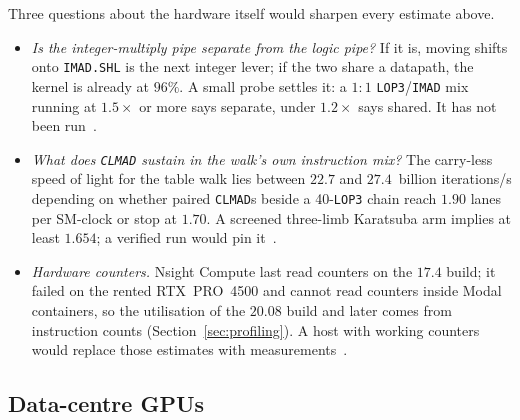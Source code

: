 Three questions about the hardware itself would sharpen every estimate
above.
\begin{itemize}[leftmargin=1.2em,itemsep=0.2em]
\item \emph{Is the integer-multiply pipe separate from the logic pipe?}
  If it is, moving shifts onto \texttt{IMAD.SHL} is the next integer
  lever; if the two share a datapath, the kernel is already at $96\%$.
  A small probe settles it: a $1{:}1$ \texttt{LOP3}/\texttt{IMAD} mix
  running at $1.5\times$ or more says separate, under $1.2\times$ says
  shared. It has not been run~.
\item \emph{What does \texttt{CLMAD} sustain in the walk's own
  instruction mix?} The carry-less speed of light for the table walk
  lies between $22.7$ and $27.4$~billion iterations/s depending on
  whether paired \texttt{CLMAD}s beside a 40-\texttt{LOP3} chain reach
  $1.90$ lanes per SM-clock or stop at $1.70$. A screened three-limb
  Karatsuba arm implies at least $1.654$; a verified run would pin
  it~.
\item \emph{Hardware counters.} Nsight Compute last read counters on
  the $17.4$ build; it failed on the rented RTX~PRO~4500 and cannot read
  counters inside Modal containers, so the utilisation of the $20.08$
  build and later comes from instruction counts
  (Section~\ref{sec:profiling}). A host with working counters would
  replace those estimates with measurements~.
\end{itemize}

\subsection{Data-centre GPUs}
\label{sec:open-gpus}

